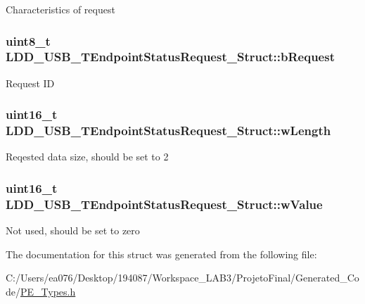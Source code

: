 Characteristics of request \hypertarget{struct_l_d_d___u_s_b___t_endpoint_status_request___struct_ae8ab1e11dae5a0b3a4b4a7256a542175}{
\subsubsection[{b\-Request}]{\setlength{\rightskip}{0pt plus 5cm}uint8\-\_\-t L\-D\-D\-\_\-\-U\-S\-B\-\_\-\-T\-Endpoint\-Status\-Request\-\_\-\-Struct\-::b\-Request}}\label{struct_l_d_d___u_s_b___t_endpoint_status_request___struct_ae8ab1e11dae5a0b3a4b4a7256a542175}
Request I\-D \hypertarget{struct_l_d_d___u_s_b___t_endpoint_status_request___struct_addba57e934f9c77c9159d7be618dd6dc}{
\subsubsection[{w\-Length}]{\setlength{\rightskip}{0pt plus 5cm}uint16\-\_\-t L\-D\-D\-\_\-\-U\-S\-B\-\_\-\-T\-Endpoint\-Status\-Request\-\_\-\-Struct\-::w\-Length}}\label{struct_l_d_d___u_s_b___t_endpoint_status_request___struct_addba57e934f9c77c9159d7be618dd6dc}
Reqested data size, should be set to 2 \hypertarget{struct_l_d_d___u_s_b___t_endpoint_status_request___struct_a987fe8c9322a22d8b5118eccd4de42c8}{
\subsubsection[{w\-Value}]{\setlength{\rightskip}{0pt plus 5cm}uint16\-\_\-t L\-D\-D\-\_\-\-U\-S\-B\-\_\-\-T\-Endpoint\-Status\-Request\-\_\-\-Struct\-::w\-Value}}\label{struct_l_d_d___u_s_b___t_endpoint_status_request___struct_a987fe8c9322a22d8b5118eccd4de42c8}
Not used, should be set to zero 

The documentation for this struct was generated from the following file\-:\begin{DoxyCompactItemize}
\item 
C\-:/\-Users/ea076/\-Desktop/194087/\-Workspace\-\_\-\-L\-A\-B3/\-Projeto\-Final/\-Generated\-\_\-\-Code/\hyperlink{_p_e___types_8h}{P\-E\-\_\-\-Types.\-h}\end{DoxyCompactItemize}
